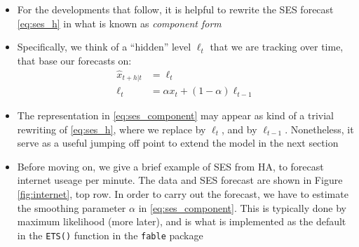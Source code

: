 \documentclass{article}
\begin{document}
\begin{itemize}
\item For the developments that follow, it is helpful to rewrite the SES forecast
  \eqref{eq:ses_h} in what is known as \emph{component form}

\item Specifically, we think of a ``hidden'' level $\ell_t$ that we are tracking
  over time, that base our forecasts on:
  \begin{equation}
  \label{eq:ses_component}
  \begin{aligned}
  \hat{x}_{t+h | t} &= \ell_t \\
  \ell_t &= \alpha x_t + (1-\alpha) \ell_{t-1}
  \end{aligned}
  \end{equation}

\item The representation in \eqref{eq:ses_component} may appear as kind of a
  trivial rewriting of \eqref{eq:ses_h}, where we replace  by $\ell_t$, and  by $\ell_{t-1}$. 
  Nonetheless, it serve as a useful jumping off point to extend the model in the 
  next section   

\item Before moving on, we give a brief example of SES from HA, to forecast
  internet useage per minute. The data and SES forecast are shown in Figure
  \ref{fig:internet}, top row. In order to carry out the forecast, we have to
  estimate the smoothing parameter $\alpha$ in \eqref{eq:ses_component}. This is 
  typically done by maximum likelihood (more later), and is what is implemented
  as the default in the \verb|ETS()| function in the \verb|fable| package 


\end{itemize}
\end{document}
